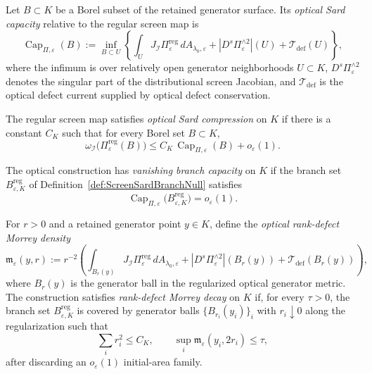 \begin{definition}\label{def:OpticalSardCapacity}
Let $B\subset K$ be a Borel subset of the retained generator surface. Its \emph{optical Sard capacity} relative to the regular screen map is
\[
    \operatorname{Cap}_{\Pi,\varepsilon}(B)
    :=
    \inf_{B\subset U}
    \left\{
        \int_U J_{\mathscr I}\Pi_{\varepsilon}^{\mathrm{reg}}\,dA_{\lambda_0,\varepsilon}
        +
        |D^s\Pi_{\varepsilon}^{\wedge 2}|(U)
        +
        \mathcal T_{\mathrm{def}}(U)
    \right\},
\]
where the infimum is over relatively open generator neighborhoods $U\subset K$, $D^s\Pi_{\varepsilon}^{\wedge 2}$ denotes the singular part of the distributional screen Jacobian, and $\mathcal T_{\mathrm{def}}$ is the optical defect current supplied by optical defect conservation.
\end{definition}

\begin{definition}\label{def:OpticalSardCompression}
The regular screen map satisfies \emph{optical Sard compression} on $K$ if there is a constant $C_K$ such that for every Borel set $B\subset K$,
\[
    \omega_{\mathscr I}\bigl(\Pi_{\varepsilon}^{\mathrm{reg}}(B)\bigr)
    \le
    C_K\,\operatorname{Cap}_{\Pi,\varepsilon}(B)
    +
    o_\varepsilon(1).
\]
\end{definition}

\begin{definition}\label{def:VanishingBranchCapacity}
The optical construction has \emph{vanishing branch capacity} on $K$ if the branch set $B_{\varepsilon,K}^{\mathrm{reg}}$ of Definition~\ref{def:ScreenSardBranchNull} satisfies
\[
    \operatorname{Cap}_{\Pi,\varepsilon}
    \bigl(B_{\varepsilon,K}^{\mathrm{reg}}\bigr)
    =
    o_\varepsilon(1).
\]
\end{definition}

\begin{definition}\label{def:OpticalRankDefectMorreyDensity}
For $r>0$ and a retained generator point $y\in K$, define the \emph{optical rank-defect Morrey density}
\[
    \mathfrak m_{\varepsilon}(y,r)
    :=
    r^{-2}
    \left(
        \int_{B_r(y)}
        J_{\mathscr I}\Pi_{\varepsilon}^{\mathrm{reg}}\,dA_{\lambda_0,\varepsilon}
        +
        |D^s\Pi_{\varepsilon}^{\wedge 2}|(B_r(y))
        +
        \mathcal T_{\mathrm{def}}(B_r(y))
    \right),
\]
where $B_r(y)$ is the generator ball in the regularized optical generator metric. The construction satisfies \emph{rank-defect Morrey decay} on $K$ if, for every $\tau>0$, the branch set $B_{\varepsilon,K}^{\mathrm{reg}}$ is covered by generator balls $\{B_{r_i}(y_i)\}_i$ with $r_i\downarrow0$ along the regularization such that
\[
    \sum_i r_i^2\le C_K,
    \qquad
    \sup_i\mathfrak m_{\varepsilon}(y_i,2r_i)\le \tau,
\]
after discarding an $o_\varepsilon(1)$ initial-area family.
\end{definition}

